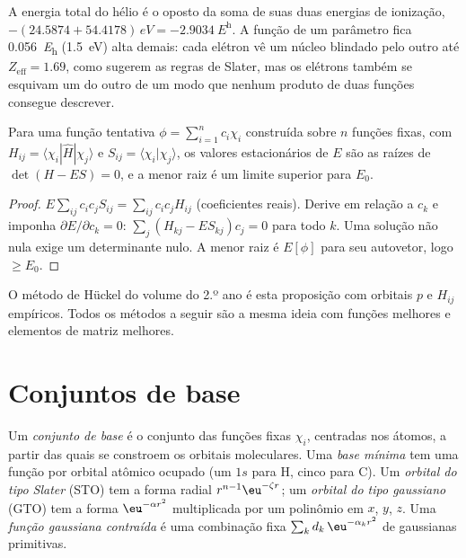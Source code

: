\begin{example}\label{ex:b3:computational-chemistry:helium}
A energia total do hélio é o oposto da soma de suas duas energias de ionização,
$-(24.5874 + 54.4178)\,\unit{eV} = \qty{-2.9034}{\hartree}$. A função de
um parâmetro fica \qty{0.056}{\hartree} (\qty{1.5}{eV}) alta demais: cada
elétron vê um núcleo blindado pelo outro até $Z_{\mathrm{eff}} = 1.69$, como
sugerem as regras de Slater, mas os elétrons também se esquivam um do outro
de um modo que nenhum produto de duas funções consegue descrever.
\end{example}

\begin{proposition}\label{prop:b3:computational-chemistry:linear-variation}
Para uma função tentativa $\phi = \sum_{i=1}^n c_i\chi_i$ construída sobre $n$ funções fixas,
com $H_{ij} = \langle\chi_i|\hat H|\chi_j\rangle$ e $S_{ij} = \langle\chi_i|\chi_j
\rangle$, os valores estacionários de $E$ são as raízes de $\det(H - ES) = 0$, e
a menor raiz é um limite superior para $E_0$.
\end{proposition}

\begin{proof}
$E\sum_{ij}c_ic_jS_{ij} = \sum_{ij}c_ic_jH_{ij}$ (coeficientes reais). Derive
em relação a $c_k$ e imponha $\partial E/\partial c_k = 0$: $\sum_j(H_{kj} -
ES_{kj})c_j = 0$ para todo $k$. Uma solução não nula exige um determinante
nulo. A menor raiz é $E[\phi]$ para seu autovetor, logo $\ge E_0$.
\end{proof}

O método de Hückel do volume do 2.º ano é esta proposição com orbitais $p$
e $H_{ij}$ empíricos. Todos os métodos a seguir são a mesma ideia com
funções melhores e elementos de matriz melhores.

\section{Conjuntos de base}

\begin{definition}\label{def:b3:computational-chemistry:basis}
Um \emph{conjunto de base} é o conjunto das funções fixas $\chi_i$,
centradas nos átomos, a partir das quais se constroem os orbitais
moleculares. Uma \emph{base mínima} tem uma função por
orbital atômico ocupado (um $1s$ para H, cinco para C). Um \emph{orbital do tipo
Slater} (STO) tem a forma radial
$r^{n-1}\eu^{-\zeta r}$; um \emph{orbital do tipo gaussiano}
(GTO) tem a forma $\eu^{-\alpha r^2}$ multiplicada por um polinômio em $x$, $y$,
$z$. Uma \emph{função gaussiana contraída}
é uma combinação fixa $\sum_kd_k\,\eu^{-\alpha_kr^2}$ de gaussianas primitivas.
\end{definition}

